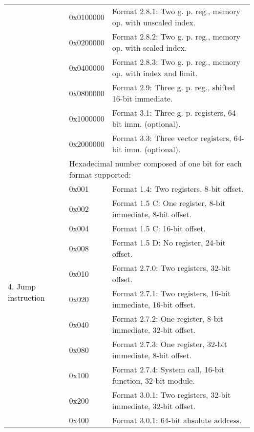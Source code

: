 \documentclass[forwardcom.tex]{subfiles}
\begin{document}
\begin{longtable} {|p{18mm}|p{14mm} p{80mm}|}
  &  0x0100000 & Format 2.8.1: Two g. p. reg., memory op. with unscaled index. \\
  &  0x0200000 & Format 2.8.2: Two g. p. reg., memory op. with scaled index. \\
  &  0x0400000 & Format 2.8.3: Two g. p. reg., memory op. with index and limit. \\
  &  0x0800000 & Format 2.9: Three g. p. reg., shifted 16-bit immediate. \\
  &  0x1000000 & Format 3.1: Three g. p. registers, 64-bit imm. (optional). \\
  &  0x2000000 & Format 3.3: Three vector registers, 64-bit imm. (optional). \\
\hline
\multirow{12}{*}{\parbox[t]{18mm}{4. Jump instruction}} 
  &  \multicolumn{2}{|l|}{
     Hexadecimal number composed of one bit for each format supported:} \\
  &  0x001 & Format 1.4: Two registers, 8-bit offset. \\
  &  0x002 & Format 1.5 C: One register, 8-bit immediate, 8-bit offset. \\
  &  0x004 & Format 1.5 C: 16-bit offset. \\
  &  0x008 & Format 1.5 D: No register, 24-bit offset. \\
  &  0x010 & Format 2.7.0: Two registers, 32-bit offset. \\
  &  0x020 & Format 2.7.1: Two registers, 16-bit immediate, 16-bit offset. \\
  &  0x040 & Format 2.7.2: One register, 8-bit immediate, 32-bit offset. \\
  &  0x080 & Format 2.7.3: One register, 32-bit immediate, 8-bit offset. \\
  &  0x100 & Format 2.7.4: System call, 16-bit function, 32-bit module. \\
  &  0x200 & Format 3.0.1: Two registers, 32-bit immediate, 32-bit offset. \\
  &  0x400 & Format 3.0.1: 64-bit absolute address. \\
\hline
\end{longtable}
\end{document}
